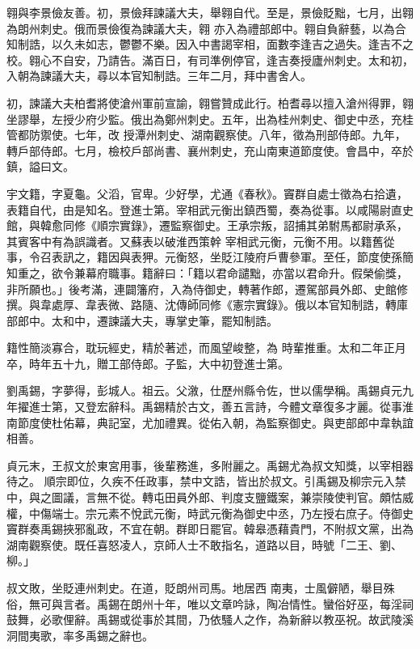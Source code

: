 \begin{pinyinscope}
 翱與李景儉友善。初，景儉拜諫議大夫，舉翱自代。至是，景儉貶黜，七月，出翱為朗州刺史。俄而景儉復為諫議大夫，翱
 亦入為禮部郎中。翱自負辭藝，以為合知制誥，以久未如志，鬱鬱不樂。因入中書謁宰相，面數李逢吉之過失。逢吉不之校。翱心不自安，乃請告。滿百日，有司準例停官，逢吉奏授廬州刺史。太和初，入朝為諫議大夫，尋以本官知制誥。三年二月，拜中書舍人。



 初，諫議大夫柏耆將使滄州軍前宣諭，翱嘗贊成此行。柏耆尋以擅入滄州得罪，翱坐謬舉，左授少府少監。俄出為鄭州刺史。五年，出為桂州刺史、御史中丞，充桂管都防禦使。七年，改
 授潭州刺史、湖南觀察使。八年，徵為刑部侍郎。九年，轉戶部侍郎。七月，檢校戶部尚書、襄州刺史，充山南東道節度使。會昌中，卒於鎮，謚曰文。



 宇文籍，字夏龜。父滔，官卑。少好學，尤通《春秋》。竇群自處士徵為右拾遺，表籍自代，由是知名。登進士第。宰相武元衡出鎮西蜀，奏為從事。以咸陽尉直史館，與韓愈同修《順宗實錄》，遷監察御史。王承宗叛，詔捕其弟駙馬都尉承系，其賓客中有為誤識者。又蘇表以破淮西策幹
 宰相武元衡，元衡不用。以籍舊從事，令召表訊之，籍因與表狎。元衡怒，坐貶江陵府戶曹參軍。至任，節度使孫簡知重之，欲令兼幕府職事。籍辭曰：「籍以君命譴黜，亦當以君命升。假榮偷獎，非所願也。」後考滿，連闢籓府，入為侍御史，轉著作郎，遷駕部員外郎、史館修撰。與韋處厚、韋表微、路隨、沈傳師同修《憲宗實錄》。俄以本官知制誥，轉庫部郎中。太和中，遷諫議大夫，專掌史筆，罷知制誥。



 籍性簡淡寡合，耽玩經史，精於著述，而風望峻整，為
 時輩推重。太和二年正月卒，時年五十九，贈工部侍郎。子監，大中初登進士第。



 劉禹錫，字夢得，彭城人。祖云。父漵，仕歷州縣令佐，世以儒學稱。禹錫貞元九年擢進士第，又登宏辭科。禹錫精於古文，善五言詩，今體文章復多才麗。從事淮南節度使杜佑幕，典記室，尤加禮異。從佑入朝，為監察御史。與吏部郎中韋執誼相善。



 貞元末，王叔文於東宮用事，後輩務進，多附麗之。禹錫尤為叔文知獎，以宰相器待之。
 順宗即位，久疾不任政事，禁中文誥，皆出於叔文。引禹錫及柳宗元入禁中，與之圖議，言無不從。轉屯田員外郎、判度支鹽鐵案，兼崇陵使判官。頗怙威權，中傷端士。宗元素不悅武元衡，時武元衡為御史中丞，乃左授右庶子。侍御史竇群奏禹錫挾邪亂政，不宜在朝。群即日罷官。韓皋憑藉貴門，不附叔文黨，出為湖南觀察使。既任喜怒凌人，京師人士不敢指名，道路以目，時號「二王、劉、柳。」



 叔文敗，坐貶連州刺史。在道，貶朗州司馬。地居西
 南夷，士風僻陋，舉目殊俗，無可與言者。禹錫在朗州十年，唯以文章吟詠，陶冶情性。蠻俗好巫，每淫祠鼓舞，必歌俚辭。禹錫或從事於其間，乃依騷人之作，為新辭以教巫祝。故武陵溪洞間夷歌，率多禹錫之辭也。




\end{pinyinscope}
